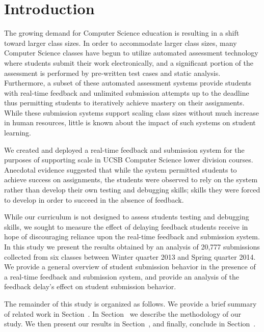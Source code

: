 \section{Introduction}
The growing demand for Computer Science education is resulting in a shift
toward larger class sizes. In order to accommodate larger class sizes, many
Computer Science classes have begun to utilize automated assessment technology
where students submit their work electronically, and a significant portion of
the assessment is performed by pre-written test cases and static
analysis. Furthermore, a subset of these automated assessment systems provide
students with real-time feedback and unlimited submission attempts up to the
deadline thus permitting students to iteratively achieve mastery on their
assignments. While these submission systems support scaling class sizes without
much increase in human resources, little is known about the impact of such
systems on student learning.

We created and deployed a real-time feedback and submission system for the
purposes of supporting scale in UCSB Computer Science lower division
courses. Anecdotal evidence suggested that while the system permitted students
to achieve success on assignments, the students were observed to rely on the
system rather than develop their own testing and debugging skills; skills they
were forced to develop in order to succeed in the absence of feedback.

While our curriculum is not designed to assess students testing and debugging
skills, we sought to measure the effect of delaying feedback students receive
in hope of discouraging reliance upon the real-time feedback and submission
system. In this study we present the results obtained by an analysis of 20,777
submissions collected from six classes between Winter quarter 2013 and Spring
quarter 2014. We provide a general overview of student submission behavior in
the presence of a real-time feedback and submission system, and provide an
analysis of the feedback delay's effect on student submission behavior.

The remainder of this study is organized as follows. We provide a brief summary
of related work in Section~. In
Section~ we describe the methodology of our study. We
then present our results in Section~, and finally,
conclude in Section~.
